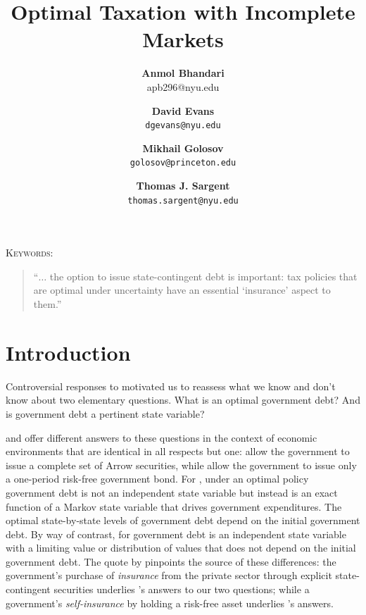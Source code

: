 \documentclass[12pt]{article}
\title {Optimal Taxation with Incomplete Markets}
\author{\textbf{Anmol Bhandari}\\apb296@nyu.edu \and \textbf{David Evans} \\ \texttt{dgevans@nyu.edu} \and \textbf{Mikhail Golosov}\\\texttt{golosov@princeton.edu} \and \textbf{Thomas J. Sargent} \\ \texttt{thomas.sargent@nyu.edu}
}
\begin{document}
\maketitle



\begin{abstract}

\end{abstract}


\noindent\textsc{Keywords:}
\begin{quote}
``$\ldots$ the option to issue state-contingent debt is important: tax policies that
are optimal under uncertainty have an essential `insurance' aspect to them.'' \quad \citet[p.~88]{LucasJr.1983}
\end{quote}
\section{Introduction}





Controversial responses to  \citet{Reinhart2010} motivated us to reassess what we know and don't know about two elementary questions.
What is an optimal  government debt? And  is government debt  a pertinent state variable? %


\citet{LucasJr.1983} and \citet{Aiyagari2002} offer  different answers to these
questions in the context of  economic environments that are identical in all respects but one: \citet{LucasJr.1983} allow the government to issue
a complete set of Arrow securities, while   \citet{Aiyagari2002} allow the government to issue only a one-period risk-free government bond.  For
\citeauthor{LucasJr.1983}, under an optimal policy  government debt is not an independent state variable but instead is an exact function of
 a Markov state variable that  drives government expenditures.  The optimal state-by-state levels of government debt  depend on the initial
 government debt.  By way of contrast, for \citet{Aiyagari2002} government debt is an independent state variable with a limiting value or distribution
 of values that does not depend on the initial government debt.  The quote by \citeauthor{LucasJr.1983} pinpoints the source of these differences:
 the government's purchase of {\em insurance} from the private sector  through explicit state-contingent securities underlies \citeauthor{LucasJr.1983}'s
 answers to our two questions; while a government's {\em self-insurance} by holding a risk-free asset underlies \citeauthor{Aiyagari2002}'s answers.
\end{document}
